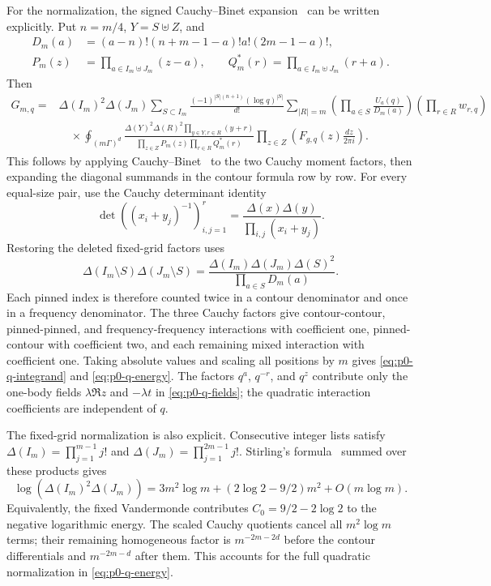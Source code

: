For the normalization, the signed Cauchy--Binet expansion~\cite{Gantmacher}
can be written
explicitly. Put $n=m/4$, $Y=S\uplus Z$, and
\[
 \begin{aligned}
 D_m(a)&=(a-n)!(n+m-1-a)!a!(2m-1-a)!,\\
 P_m(z)&=\prod_{a\in I_m\uplus J_m}(z-a),\qquad
 Q_m^*(r)=\prod_{a\in I_m\uplus J_m}(r+a).
 \end{aligned}
\]
Then
\begin{align*}
G_{m,q}={}&\Delta(I_m)^2\Delta(J_m)
 \sum_{S\subset I_m}\frac{(-1)^{|S|(n+1)}(\log q)^{|S|}}{d!}
 \sum_{|R|=m}
 \left(\prod_{a\in S}\frac{U_a(q)}{D_m(a)}\right)
 \left(\prod_{r\in R}w_{r,q}\right)\\
&\quad\times\oint_{(m\Gamma)^d}
 \frac{\Delta(Y)^2\Delta(R)^2\prod_{y\in Y,r\in R}(y+r)}
      {\prod_{z\in Z}P_m(z)\prod_{r\in R}Q_m^*(r)}
      \prod_{z\in Z}\left(F_{g,q}(z)\frac{dz}{2\pi i}\right).
\end{align*}
This follows by applying Cauchy--Binet~\cite{Gantmacher} to the two Cauchy
moment factors,
then expanding the diagonal summands in the contour formula row by row.
For every equal-size pair, use the Cauchy determinant identity~\cite{Krattenthaler}
\[
 \det\left((x_i+y_j)^{-1}\right)_{i,j=1}^r
 =\frac{\Delta(x)\Delta(y)}{\prod_{i,j}(x_i+y_j)}.
\]
Restoring the deleted fixed-grid factors uses
\[
 \Delta(I_m\setminus S)\Delta(J_m\setminus S)
 =\frac{\Delta(I_m)\Delta(J_m)\Delta(S)^2}
        {\prod_{a\in S}D_m(a)}.
\]
Each pinned index is therefore counted twice in a contour denominator and
once in a frequency denominator. The three Cauchy factors give
contour-contour, pinned-pinned, and frequency-frequency interactions with
coefficient one, pinned-contour with coefficient two, and each remaining
mixed interaction with coefficient one. Taking absolute values and scaling
all positions by $m$ gives \eqref{eq:p0-q-integrand} and
\eqref{eq:p0-q-energy}. The factors $q^a$, $q^{-r}$, and $q^z$ contribute
only the one-body fields $\lambda\Re z$ and $-\lambda t$ in
\eqref{eq:p0-q-fields}; the quadratic interaction coefficients are
independent of $q$.

The fixed-grid normalization is also explicit.  Consecutive integer lists
satisfy $\Delta(I_m)=\prod_{j=1}^{m-1}j!$ and
$\Delta(J_m)=\prod_{j=1}^{2m-1}j!$.  Stirling's formula~\cite{WhittakerWatson}
summed over these
products gives
\[
 \log(\Delta(I_m)^2\Delta(J_m))
 =3m^2\log m+(2\log2-9/2)m^2+O(m\log m).
\]
Equivalently, the fixed Vandermonde contributes $C_0=9/2-2\log2$ to
the negative logarithmic energy.  The scaled Cauchy quotients cancel all
$m^2\log m$ terms; their remaining homogeneous factor is
$m^{-2m-2d}$ before the contour differentials and $m^{-2m-d}$ after them.
This accounts for the full quadratic normalization in
\eqref{eq:p0-q-energy}.

